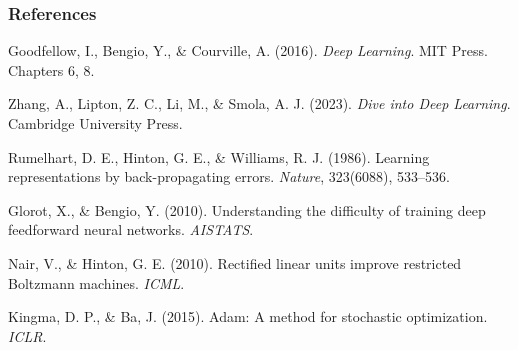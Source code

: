 \documentclass[notes,11pt, aspectratio=169]{beamer}
\newenvironment{wideitemize}{\itemize\addtolength{\itemsep}{10pt}}{\enditemize}
\begin{document}
\begin{frame}
\frametitle{References}

\small
\begin{wideitemize}
    \item Goodfellow, I., Bengio, Y., \& Courville, A. (2016). \textit{Deep Learning}. MIT Press. Chapters 6, 8.
    \item Zhang, A., Lipton, Z. C., Li, M., \& Smola, A. J. (2023). \textit{Dive into Deep Learning}. Cambridge University Press.
    \item Rumelhart, D. E., Hinton, G. E., \& Williams, R. J. (1986). Learning representations by back-propagating errors. \textit{Nature}, 323(6088), 533--536.
    \item Glorot, X., \& Bengio, Y. (2010). Understanding the difficulty of training deep feedforward neural networks. \textit{AISTATS}.
    \item Nair, V., \& Hinton, G. E. (2010). Rectified linear units improve restricted Boltzmann machines. \textit{ICML}.
    \item Kingma, D. P., \& Ba, J. (2015). Adam: A method for stochastic optimization. \textit{ICLR}.
\end{wideitemize}
\end{frame}
\end{document}
